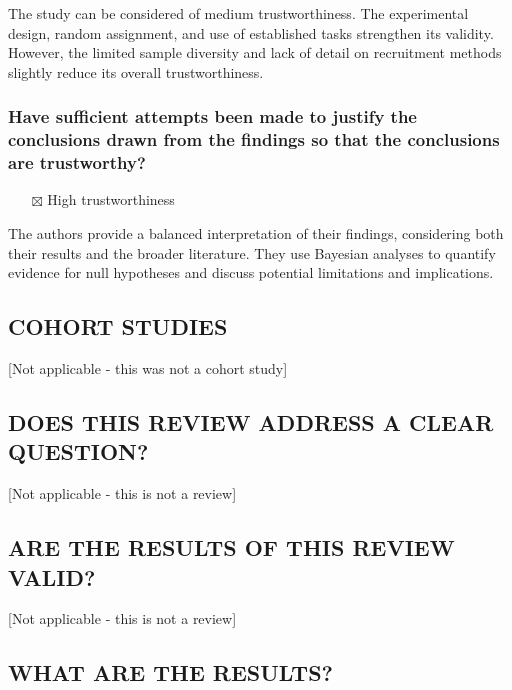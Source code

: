 \documentclass[
  doc, a4paper]{apa7}
\providecommand{\tightlist}{%
  \setlength{\itemsep}{0pt}\setlength{\parskip}{0pt}}
\begin{document}
The study can be considered of medium trustworthiness. The experimental design, random assignment, and use of established tasks strengthen its validity. However, the limited sample diversity and lack of detail on recruitment methods slightly reduce its overall trustworthiness.

\subsubsection{Have sufficient attempts been made to justify the conclusions drawn from the findings so that the conclusions are trustworthy?}\label{have-sufficient-attempts-been-made-to-justify-the-conclusions-drawn-from-the-findings-so-that-the-conclusions-are-trustworthy}

\begin{itemize}
\tightlist
\item[$\boxtimes$]
  High trustworthiness
\end{itemize}

The authors provide a balanced interpretation of their findings, considering both their results and the broader literature. They use Bayesian analyses to quantify evidence for null hypotheses and discuss potential limitations and implications.

\subsection{\texorpdfstring{\textbf{COHORT STUDIES}}{COHORT STUDIES}}\label{cohort-studies}

{[}Not applicable - this was not a cohort study{]}

\subsection{DOES THIS REVIEW ADDRESS A CLEAR QUESTION?}\label{does-this-review-address-a-clear-question}

{[}Not applicable - this is not a review{]}

\subsection{ARE THE RESULTS OF THIS REVIEW VALID?}\label{are-the-results-of-this-review-valid}

{[}Not applicable - this is not a review{]}

\subsection{WHAT ARE THE RESULTS?}\label{what-are-the-results}
\end{document}
